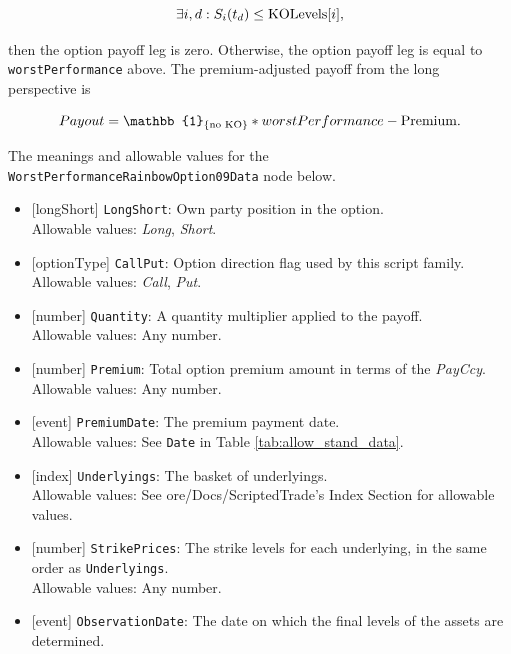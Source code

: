 \begin{equation*}
  \exists i, d : S_i(t_d) \leq \text{\lstinline!KOLevels!}[i],
\end{equation*}

then the option payoff leg is zero. Otherwise, the option payoff leg is equal to
\lstinline!worstPerformance! above. The premium-adjusted payoff from the long perspective is

\begin{equation*}
  Payout = \mathbb{1}_{\{\text{no KO}\}} * worstPerformance - \text{\lstinline!Premium!}.
\end{equation*}

The meanings and allowable values for the \lstinline!WorstPerformanceRainbowOption09Data! node below.

\begin{itemize}
  \item{}[longShort] \lstinline!LongShort!: Own party position in the option. \\
  Allowable values: \emph{Long}, \emph{Short}.
  \item{}[optionType] \lstinline!CallPut!: Option direction flag used by this script family. \\
  Allowable values: \emph{Call}, \emph{Put}.
  \item{}[number] \lstinline!Quantity!: A quantity multiplier applied to the payoff. \\
  Allowable values: Any number.
  \item{}[number] \lstinline!Premium!: Total option premium amount in terms of the \emph{PayCcy}. \\
  Allowable values: Any number.
  \item{}[event] \lstinline!PremiumDate!: The premium payment date. \\
  Allowable values: See \lstinline!Date! in Table \ref{tab:allow_stand_data}.
  \item{}[index] \lstinline!Underlyings!: The basket of underlyings. \\
  Allowable values: See ore/Docs/ScriptedTrade's Index Section for allowable values.
  \item{}[number] \lstinline!StrikePrices!: The strike levels for each underlying, in the same order as \lstinline!Underlyings!. \\
  Allowable values: Any number.
  \item{}[event] \lstinline!ObservationDate!: The date on which the final levels of the assets are determined. \\

\end{itemize}
